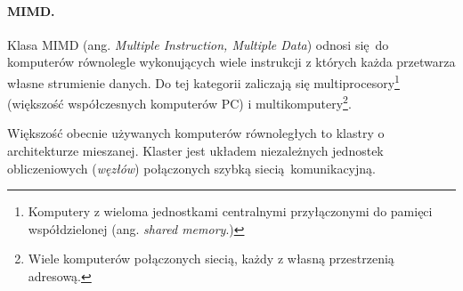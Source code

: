 \paragraph{MIMD.}
Klasa MIMD  (ang. \emph{Multiple Instruction, Multiple Data})
odnosi się do komputerów równolegle wykonujących wiele instrukcji z których każda przetwarza własne strumienie danych. Do tej kategorii zaliczają się multiprocesory\footnote{Komputery z wieloma jednostkami centralnymi przyłączonymi do pamięci współdzielonej (ang. \emph{shared memory}.)} (większość współczesnych komputerów PC) i multikomputery\footnote{Wiele komputerów połączonych siecią, każdy z własną przestrzenią adresową.}. 


Większość obecnie używanych komputerów równoległych to klastry o architekturze mieszanej. Klaster jest układem niezależnych jednostek obliczeniowych (\emph{węzłów}) połączonych szybką siecią komunikacyjną. 